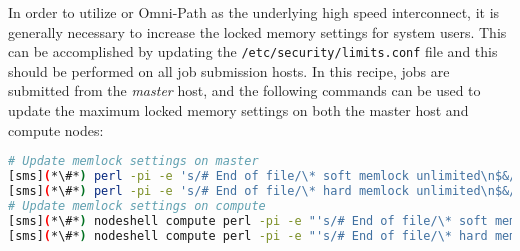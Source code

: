 In order to utilize \InfiniBand{} or Omni-Path as the underlying high speed interconnect, it is
generally necessary to increase the locked memory settings for system
users. This can be accomplished by updating
the \texttt{/etc/security/limits.conf} file and this should be performed
on all job submission hosts. In this recipe, jobs
are submitted from the {\em master} host, and the following commands can be
used to update the maximum locked memory settings on both the master host and
compute nodes:

\begin{lstlisting}[language=bash,keywords={},upquote=true]
# Update memlock settings on master
[sms](*\#*) perl -pi -e 's/# End of file/\* soft memlock unlimited\n$&/s' /etc/security/limits.conf
[sms](*\#*) perl -pi -e 's/# End of file/\* hard memlock unlimited\n$&/s' /etc/security/limits.conf
# Update memlock settings on compute
[sms](*\#*) nodeshell compute perl -pi -e "'s/# End of file/\* soft memlock unlimited\n$&/s' /etc/security/limits.conf"
[sms](*\#*) nodeshell compute perl -pi -e "'s/# End of file/\* hard memlock unlimited\n$&/s' /etc/security/limits.conf"
\end{lstlisting}
